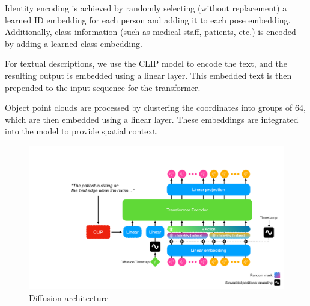 Identity encoding is achieved by randomly selecting (without replacement) a learned ID embedding for each person and adding it to each pose embedding. Additionally, class information (such as medical staff, patients, etc.) is encoded by adding a learned class embedding.

For textual descriptions, we use the CLIP model to encode the text, and the resulting output is embedded using a linear layer. This embedded text is then prepended to the input sequence for the transformer.

Object point clouds are processed by clustering the coordinates into groups of 64, which are then embedded using a linear layer. These embeddings are integrated into the model to provide spatial context.

\begin{figure}[H]
    \hspace*{-3cm}
    \includegraphics[width=\linewidth+3cm]{figures/diffusion-model.pdf}
    \caption{Diffusion architecture}
    \label{fig:diffusion-model}
\end{figure}


